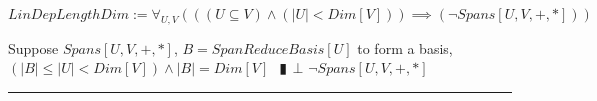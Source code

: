 \documentclass{book}
\newcommand{\abr}{:=}
\newcommand{\pipe}{$\phantom{(}\vrectangleblack\phantom{)}$}
\newcommand{\pr}[1]{\left(#1\right)}
\begin{document}
$LinDepLengthDim \abr \forall_{U, V}\pr{\pr{(U \subseteq V) \land (|U| < Dim[V])} \implies (\lnot Spans[U, V, +, *])}$
\begin{enumerate}
  \lit Suppose $Spans[U, V, +, *]$, $B = SpanReduceBasis[U]$ to form a basis, $(|B| \leq |U| < Dim[V]) \land |B| = Dim[V]$ \pipe $\bot$
  \lit $\lnot Spans[U, V, +, *]$
\end{enumerate} \vspace{.75mm} \hrule \vspace{.75mm} \ \\ 

\begin{comment}
  $DimSub \abr \forall_{U, V}\pr{\pr{(FinDim[V, +, *]) \land (Subspace[U, V, +, *])} \implies (Dim[U] \leq Dim[V])}$
  \begin{enumerate}
    \lit TODO ???
  \end{enumerate} \vspace{.75mm} \hrule \vspace{.75mm} \ \\ 

  $DimSum \abr \forall_{U_1, U_2, V}\pr{((FinDim[V, +, *]) \land (Subspace[U_1, V, +, *]) \land (Subspace[U_2, V, +, *])} \\
      \implies (Dim[U_1 + U_2] = Dim[U_1] + Dim[U_2] - Dim[U_1 \cap U_2]))$
  \begin{enumerate}
    \lit TODO
  \end{enumerate} \vspace{.75mm} \hrule \vspace{.75mm} \ \\ 


\end{comment}
\end{document}
